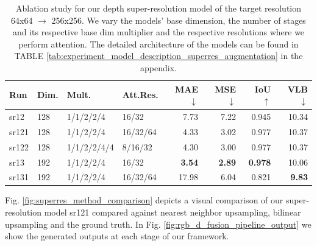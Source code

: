 \begin{table}[t]
\tiny
\centering
\caption{Ablation study for our depth super-resolution model of the target resolution 64x64 $\rightarrow$ 256x256. We vary the models' base dimension, the number of stages and its respective base dim multiplier and the respective resolutions where we perform attention. The detailed architecture of the models can be found in TABLE \ref{tab:experiment_model_description_superres_augmentation} in the appendix.}
\label{tab:superres_high_res}
\begin{tabular}{ l | l l l | r | r | r | r }
\hline
\textbf{Run} & \textbf{Dim.} & \textbf{Mult.} & \textbf{Att.Res.} & \textbf{MAE} $\downarrow$ & \textbf{MSE} $\downarrow$ & \textbf{IoU} $\uparrow$ & \textbf{VLB} $\downarrow$ \\ 
\hline
\hline
sr12  & 128 & 1/1/2/2/4   & 16/32    & 7.73 & 7.22 & 0.945 & 10.34 \\ 
sr121 & 128 & 1/1/2/2/4   & 16/32/64 & 4.33 & 3.02 & 0.977 & 10.37 \\ 
sr122 & 128 & 1/1/2/2/4/4 & 8/16/32  & 4.30 & 3.00 & 0.977 & 10.37 \\ 
sr13  & 192 & 1/1/2/2/4   & 16/32    & \textbf{3.54} & \textbf{2.89} & \textbf{0.978} & 10.06 \\ 
sr131 & 192 & 1/1/2/2/4   & 16/32/64 & 17.98 & 6.04 & 0.821 & \textbf{9.83} \\
\hline
\end{tabular}
\end{table}

Fig. \ref{fig:superres_method_comparison} depicts a visual comparison of our super-resolution model sr121 compared against nearest neighbor upsampling, bilinear upsampling and the ground truth. In Fig. \ref{fig:rgb_d_fusion_pipeline_output} we show the generated outputs at each stage of our \modelname{} framework.

